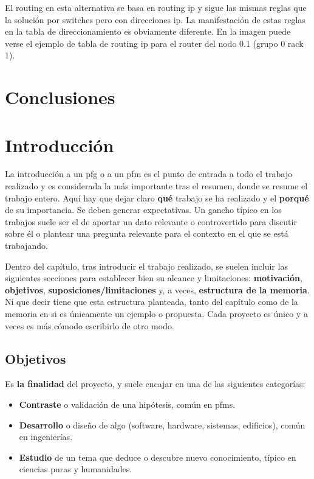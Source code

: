 \documentclass[%
    school=etsisi,%
    degree=61TI,%
]{upm-report}
\begin{document}
El routing en esta alternativa se basa en routing ip y sigue las mismas reglas que la solución por switches pero con direcciones ip. La manifestación de estas reglas en la tabla de direccionamiento es obviamente diferente. En la imagen puede verse el ejemplo de tabla de routing ip para el router del nodo 0.1 (grupo 0 rack 1).

\chapter{Conclusiones}
\label{ch:conclusiones}



\chapter{Introducción}
\label{ch:introduccion}

La introducción a un \gls{pfg} o a un \gls{pfm} es el punto de entrada a
todo el trabajo realizado y es considerada la más importante tras el
resumen, donde se resume el trabajo entero. Aquí hay que dejar claro
\textbf{qué} trabajo se ha realizado y el \textbf{porqué} de su
importancia. Se deben generar expectativas. Un gancho típico en los
trabajos suele ser el de aportar un dato relevante o controvertido para
discutir sobre él o plantear una pregunta relevante para el contexto en
el que se está trabajando.

Dentro del capítulo, tras introducir el trabajo realizado, se suelen
incluir las siguientes secciones para establecer bien su alcance y
limitaciones: \textbf{motivación}, \textbf{objetivos},
\textbf{suposiciones/limitaciones} y, a veces,
\textbf{estructura de la memoria}. Ni que decir tiene que esta
estructura planteada, tanto del capítulo como de la memoria en si es
únicamente un ejemplo o propuesta. Cada proyecto es único y a veces es
más cómodo escribirlo de otro modo.

\section{Objetivos}

Es \textbf{la finalidad} del proyecto, y suele encajar en una de las
siguientes categorías:

\begin{itemize}
    \item \textbf{Contraste} o validación de una hipótesis, común en
        \glspl{pfm}.
    \item \textbf{Desarrollo} o diseño de algo (software, hardware,
        sistemas, edificios), común en ingenierías.
    \item \textbf{Estudio} de un tema que deduce o descubre nuevo
        conocimiento, típico en ciencias puras y humanidades.
\end{itemize}
\end{document}
